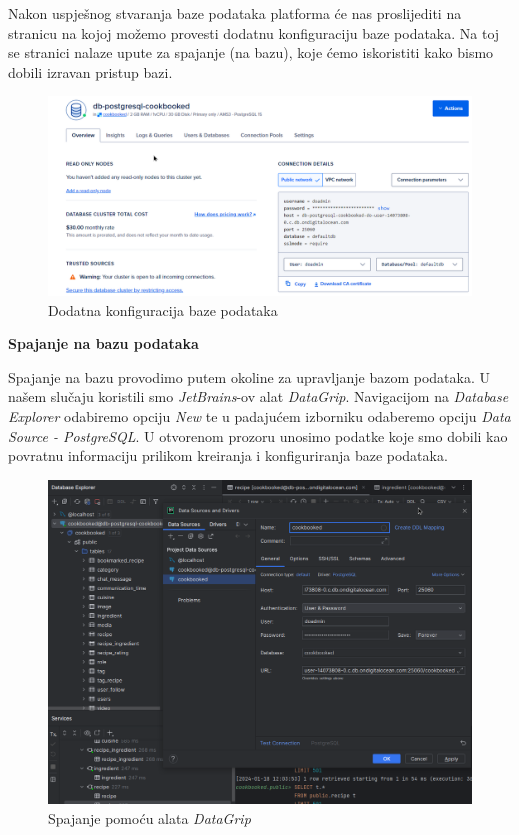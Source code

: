 			\noindent Nakon uspješnog stvaranja baze podataka platforma će nas proslijediti na stranicu
			na kojoj možemo provesti dodatnu konfiguraciju baze podataka. Na toj se stranici
			nalaze upute za spajanje (na bazu), koje ćemo iskoristiti kako bismo dobili izravan
			pristup bazi.

			\begin{figure}[H]
				\includegraphics[scale=0.4]{slike/add_conf_base.png}
				\centering
				\caption{Dodatna konfiguracija baze podataka}
				\label{fig:addbaseconf}
			\end{figure}

			\eject
			\noindent \textbf{Spajanje na bazu podataka}

			\noindent Spajanje na bazu provodimo putem okoline za upravljanje bazom podataka.
			U našem slučaju koristili smo \textit{JetBrains}-ov alat \textit{DataGrip}.
			Navigacijom na \textit{Database Explorer} odabiremo opciju \textit{New} te u padajućem
			izborniku odaberemo opciju \textit{Data Source - PostgreSQL}. U otvorenom prozoru
			unosimo podatke koje smo dobili kao povratnu informaciju prilikom kreiranja i konfiguriranja
			baze podataka.

			\begin{figure}[H]
				\includegraphics[scale=0.4]{slike/conn_base.png}
				\centering
				\caption{Spajanje pomoću alata \textit{DataGrip}}
				\label{fig:conbase}
			\end{figure}

